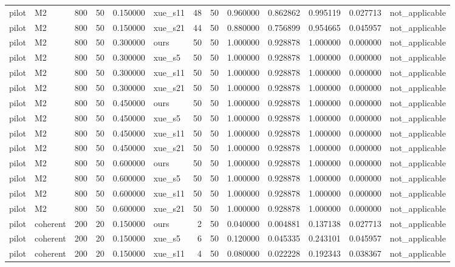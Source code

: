 \begin{longtable}{llrrrlrrrrrrl}
pilot & M2 & 800 & 50 & 0.150000 & xue\_s11 & 48 & 50 & 0.960000 & 0.862862 & 0.995119 & 0.027713 & not\_applicable \\
pilot & M2 & 800 & 50 & 0.150000 & xue\_s21 & 44 & 50 & 0.880000 & 0.756899 & 0.954665 & 0.045957 & not\_applicable \\
pilot & M2 & 800 & 50 & 0.300000 & ours & 50 & 50 & 1.000000 & 0.928878 & 1.000000 & 0.000000 & not\_applicable \\
pilot & M2 & 800 & 50 & 0.300000 & xue\_s5 & 50 & 50 & 1.000000 & 0.928878 & 1.000000 & 0.000000 & not\_applicable \\
pilot & M2 & 800 & 50 & 0.300000 & xue\_s11 & 50 & 50 & 1.000000 & 0.928878 & 1.000000 & 0.000000 & not\_applicable \\
pilot & M2 & 800 & 50 & 0.300000 & xue\_s21 & 50 & 50 & 1.000000 & 0.928878 & 1.000000 & 0.000000 & not\_applicable \\
pilot & M2 & 800 & 50 & 0.450000 & ours & 50 & 50 & 1.000000 & 0.928878 & 1.000000 & 0.000000 & not\_applicable \\
pilot & M2 & 800 & 50 & 0.450000 & xue\_s5 & 50 & 50 & 1.000000 & 0.928878 & 1.000000 & 0.000000 & not\_applicable \\
pilot & M2 & 800 & 50 & 0.450000 & xue\_s11 & 50 & 50 & 1.000000 & 0.928878 & 1.000000 & 0.000000 & not\_applicable \\
pilot & M2 & 800 & 50 & 0.450000 & xue\_s21 & 50 & 50 & 1.000000 & 0.928878 & 1.000000 & 0.000000 & not\_applicable \\
pilot & M2 & 800 & 50 & 0.600000 & ours & 50 & 50 & 1.000000 & 0.928878 & 1.000000 & 0.000000 & not\_applicable \\
pilot & M2 & 800 & 50 & 0.600000 & xue\_s5 & 50 & 50 & 1.000000 & 0.928878 & 1.000000 & 0.000000 & not\_applicable \\
pilot & M2 & 800 & 50 & 0.600000 & xue\_s11 & 50 & 50 & 1.000000 & 0.928878 & 1.000000 & 0.000000 & not\_applicable \\
pilot & M2 & 800 & 50 & 0.600000 & xue\_s21 & 50 & 50 & 1.000000 & 0.928878 & 1.000000 & 0.000000 & not\_applicable \\
pilot & coherent & 200 & 20 & 0.150000 & ours & 2 & 50 & 0.040000 & 0.004881 & 0.137138 & 0.027713 & not\_applicable \\
pilot & coherent & 200 & 20 & 0.150000 & xue\_s5 & 6 & 50 & 0.120000 & 0.045335 & 0.243101 & 0.045957 & not\_applicable \\
pilot & coherent & 200 & 20 & 0.150000 & xue\_s11 & 4 & 50 & 0.080000 & 0.022228 & 0.192343 & 0.038367 & not\_applicable \\

\end{longtable}
